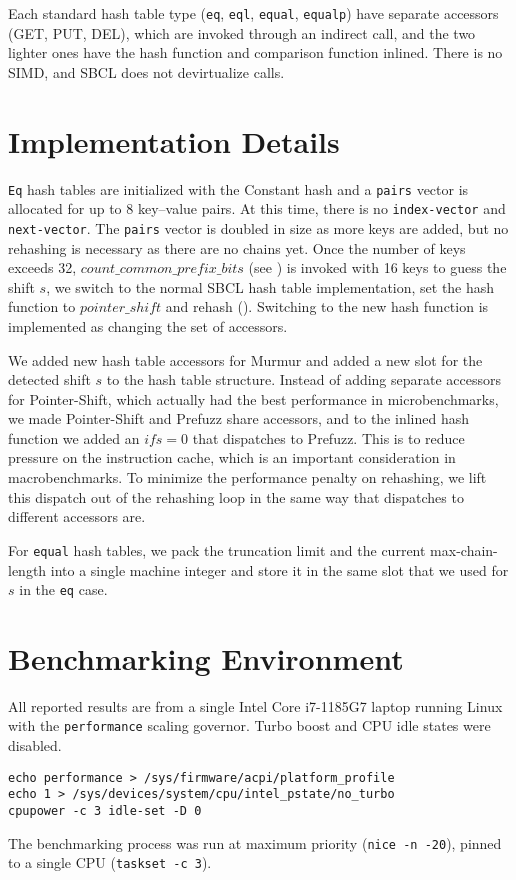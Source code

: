 \documentclass[sigconf]{acmart}
\newcommand*\lisp[1]{\texttt{#1}}
\renewcommand{\label}[1]{%
    \gdef\sfname{sf:##1}}%
\begin{document}
Each standard hash table type (\lisp{eq}, \lisp{eql}, \lisp{equal}, \lisp{equalp}) have separate accessors (GET, PUT, DEL), which are invoked through an indirect call, and the two lighter ones have the hash function and comparison function inlined.
There is no SIMD, and SBCL does not devirtualize calls.


\section{Implementation Details}
\label{sec:implementation-details}

\lisp{Eq} hash tables are initialized with the Constant hash and a \lisp{pairs} vector is allocated for up to 8 key--value pairs.
At this time, there is no \lisp{index-vector} and \lisp{next-vector}.
The \lisp{pairs} vector is doubled in size as more keys are added, but no rehashing is necessary as there are no chains yet.
Once the number of keys exceeds 32, $\mathit{count\_common\_prefix\_bits}$ (see ) is invoked with 16 keys to guess the shift $s$, we switch to the normal SBCL hash table implementation, set the hash function to $\mathit{pointer\_shift}$ and rehash ().
Switching to the new hash function is implemented as changing the set of accessors.

We added new hash table accessors for Murmur and added a new slot for the detected shift $s$ to the hash table structure.
Instead of adding separate accessors for Pointer-Shift, which actually had the best performance in microbenchmarks, we made Pointer-Shift and Prefuzz share accessors, and to the inlined hash function we added an $\mathit{if} s = 0$ that dispatches to Prefuzz.
This is to reduce pressure on the instruction cache, which is an important consideration in macrobenchmarks.
To minimize the performance penalty on rehashing, we lift this dispatch out of the rehashing loop in the same way that dispatches to different accessors are.

For \lisp{equal} hash tables, we pack the truncation limit and the current max-chain-length into a single machine integer and store it in the same slot that we used for $s$ in the \lisp{eq} case.


\section{Benchmarking Environment}
\label{sec:benchmarking-environment}

All reported results are from a single Intel Core i7-1185G7 laptop running Linux with the \texttt{performance} scaling governor.
Turbo boost and CPU idle states were disabled.
\begin{verbatim}
echo performance > /sys/firmware/acpi/platform_profile
echo 1 > /sys/devices/system/cpu/intel_pstate/no_turbo
cpupower -c 3 idle-set -D 0
\end{verbatim}
The benchmarking process was run at maximum priority (\texttt{nice -n -20}), pinned to a single CPU (\texttt{taskset -c 3}).

\end{document}
